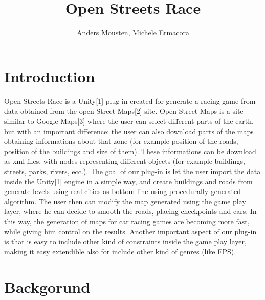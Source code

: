 \documentclass[conference]{IEEEtran}
\begin{document}
\title{\ \\ \LARGE\bf Open Streets Race}

\author{Anders Mousten, Michele Ermacora}


\maketitle

%

\section{Introduction}

Open Streets Race is a Unity[1] plug-in created for generate a racing game from data obtained from the open Street Maps[2] site. Open Street Maps is a site similar to Google Maps[3] where the user can select different parts of the earth, but with an important difference: the user can also download parts of the maps obtaining informations about that zone (for example position of the roads, position of the buildings and size of them). These informations can be download as xml files, with nodes representing different objects (for example buildings, streets, parks, rivers, ecc.). The goal of our plug-in is let the user import the data inside the Unity[1] engine in a simple way, and create buildings and roads from generate levels using real cities as bottom line using procedurally generated algorithm. The user then can modify the map generated using the game play layer, where he can decide to smooth the roads, placing checkpoints and cars. In this way, the generation of maps for car racing games are becoming more fast, while giving him control on the results.  Another important aspect of our plug-in is that is easy to include other kind of constraints inside the game play layer, making it easy extendible also for include other kind of genres (like FPS).

\section{Backgorund}
\end{document}
